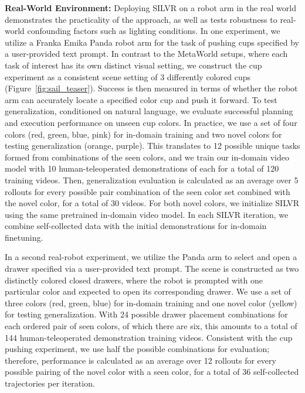 \textbf{Real-World Environment:} Deploying SILVR on a robot arm in the real world demonstrates the practicality of the approach, as well as tests robustness to real-world confounding factors such as lighting conditions.  In one experiment, we utilize a Franka Emika Panda robot arm for the task of pushing cups specified by a user-provided text prompt.  In contrast to the MetaWorld setups, where each task of interest has its own distinct visual setting, we construct the cup experiment as a consistent scene setting of 3 differently colored cups (Figure~\ref{fig:sail_teaser}). Success is then measured in terms of whether the robot arm can accurately locate a specified color cup and push it forward.  To test generalization, conditioned on natural language, we evaluate successful planning and execution performance on unseen cup colors.  In practice, we use a set of four colors (red, green, blue, pink) for in-domain training and two novel colors for testing generalization (orange, purple).  This translates to 12 possible unique tasks formed from combinations of the seen colors, and we train our in-domain video model with 10 human-teleoperated demonstrations of each for a total of 120 training videos. Then, generalization evaluation is calculated as an average over 5 rollouts for every possible pair combination of the seen color set combined with the novel color, for a total of 30 videos. For both novel colors, we initialize SILVR using the same pretrained in-domain video model. In each SILVR iteration, we combine self-collected data with the initial demonstrations for in-domain finetuning.

In a second real-robot experiment, we utilize the Panda arm to select and open a drawer specified via a user-provided text prompt.  The scene is constructed as two distinctly colored closed drawers, where the robot is prompted with one particular color and expected to open its corresponding drawer.  We use a set of three colors (red, green, blue) for in-domain training and one novel color (yellow) for testing generalization.  With 24 possible drawer placement combinations for each ordered pair of seen colors, of which there are six, this amounts to a total of 144 human-teleoperated demonstration training videos.  Consistent with the cup pushing experiment, we use half the possible combinations for evaluation; therefore, performance is calculated as an average over 12 rollouts for every possible pairing of the novel color with a seen color, for a total of 36 self-collected trajectories per iteration.  

